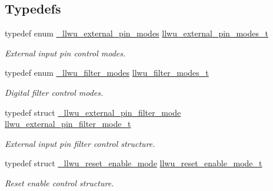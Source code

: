 \subsection*{Typedefs}
\begin{DoxyCompactItemize}
\item 
typedef enum \hyperlink{group__llwu__hal_gaacfc7183624cb7e29378dd7ef281400f}{\+\_\+llwu\+\_\+external\+\_\+pin\+\_\+modes} \hyperlink{group__llwu__hal_ga7610065fdfea6c83871350572d6dae3b}{llwu\+\_\+external\+\_\+pin\+\_\+modes\+\_\+t}\hypertarget{group__llwu__hal_ga7610065fdfea6c83871350572d6dae3b}{}\label{group__llwu__hal_ga7610065fdfea6c83871350572d6dae3b}

\begin{DoxyCompactList}\small\item\em External input pin control modes. \end{DoxyCompactList}\item 
typedef enum \hyperlink{group__llwu__hal_ga6f39ca3519f267f6c98e9addd24da8d5}{\+\_\+llwu\+\_\+filter\+\_\+modes} \hyperlink{group__llwu__hal_ga38fe75a772f102c3273d23bdefb37c1b}{llwu\+\_\+filter\+\_\+modes\+\_\+t}\hypertarget{group__llwu__hal_ga38fe75a772f102c3273d23bdefb37c1b}{}\label{group__llwu__hal_ga38fe75a772f102c3273d23bdefb37c1b}

\begin{DoxyCompactList}\small\item\em Digital filter control modes. \end{DoxyCompactList}\item 
typedef struct \hyperlink{struct__llwu__external__pin__filter__mode}{\+\_\+llwu\+\_\+external\+\_\+pin\+\_\+filter\+\_\+mode} \hyperlink{group__llwu__hal_gac8214238539a6dde5aa93d96bef7fa12}{llwu\+\_\+external\+\_\+pin\+\_\+filter\+\_\+mode\+\_\+t}\hypertarget{group__llwu__hal_gac8214238539a6dde5aa93d96bef7fa12}{}\label{group__llwu__hal_gac8214238539a6dde5aa93d96bef7fa12}

\begin{DoxyCompactList}\small\item\em External input pin filter control structure. \end{DoxyCompactList}\item 
typedef struct \hyperlink{struct__llwu__reset__enable__mode}{\+\_\+llwu\+\_\+reset\+\_\+enable\+\_\+mode} \hyperlink{group__llwu__hal_ga8ed23ceb85c8b2cffda07e2a32dd9149}{llwu\+\_\+reset\+\_\+enable\+\_\+mode\+\_\+t}\hypertarget{group__llwu__hal_ga8ed23ceb85c8b2cffda07e2a32dd9149}{}\label{group__llwu__hal_ga8ed23ceb85c8b2cffda07e2a32dd9149}

\begin{DoxyCompactList}\small\item\em Reset enable control structure. \end{DoxyCompactList}\end{DoxyCompactItemize}
